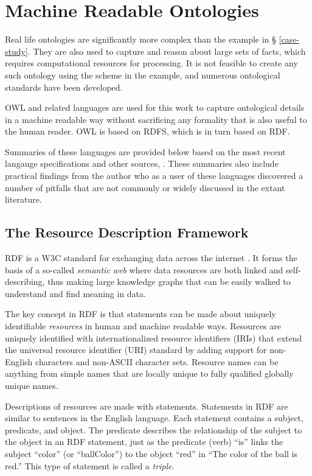 \section{Machine Readable Ontologies}

Real life ontologies are significantly more complex than the example in \S
\ref{case-study}. They are also used to capture and reason about large sets of
facts, which requires computational resources for processing. It is not feasible
to create any such ontology using the scheme in the example, and numerous
ontological standards have been developed. 

OWL and related languages are used for this work to
capture ontological details in a machine readable way without sacrificing any
formality that is also useful to the human reader. OWL is based on RDFS, which
is in turn based on RDF.

Summaries of these languages are provided below based on the most recent
langauge specifications and other sources, \cite{allemang_semantic_2008}. These
summaries also include practical findings from the author who as a user of
these languages discovered a number of pitfalls that are not commonly or widely
discussed in the extant literature.

\subsection{The Resource Description Framework}

RDF is a W3C standard for exchanging data
across the internet \cite{rdf-w3c,rdf-concepts-syntax}. It forms the basis of a
so-called \textit{semantic web} where data resources are both linked and
self-describing, thus making large knowledge graphs that can be easily walked
to understand and find meaning in data.

The key concept in RDF is that statements can be made about uniquely
identifiable \textit{resources} in human and machine readable ways. Resources
are uniquely identified with internationalized resource identifiers (IRIs) that
extend the universal resource identifier (URI) standard by adding support for
non-English characters and non-ASCII character sets. Resource names can be
anything from simple names that are locally unique to fully qualified globally
unique names.

Descriptions of resources are made with statements. Statements in RDF are
similar to sentences in the English language. Each statement contains a subject,
predicate, and object. The predicate describes the relationship of the subject
to the object in an RDF statement, just as the predicate (verb) ``is'' links the
subject ``color'' (or ``ballColor'') to the object ``red'' in ``The color of
the ball is red.'' This type of statement is called a \textit{triple}.

